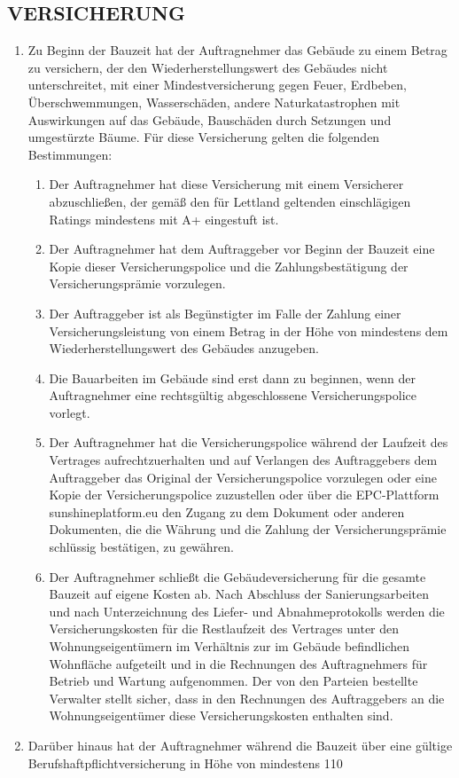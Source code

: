 \begin{multicols}{2}
   \subsection{VERSICHERUNG}
   \begin{enumerate}
     \item Zu Beginn der Bauzeit hat der Auftragnehmer das Gebäude zu einem Betrag zu versichern, der den Wiederherstellungswert des Gebäudes nicht unterschreitet, mit einer Mindestversicherung gegen Feuer, Erdbeben, Überschwemmungen, Wasserschäden, andere Naturkatastrophen mit Auswirkungen auf das Gebäude, Bauschäden durch Setzungen und umgestürzte Bäume. Für diese Versicherung gelten die folgenden Bestimmungen:
     \begin{enumerate}
   \item Der Auftragnehmer hat diese Versicherung mit einem Versicherer abzuschließen, der gemäß den für Lettland geltenden einschlägigen Ratings mindestens mit A+ eingestuft ist.
   \item Der Auftragnehmer hat dem Auftraggeber vor Beginn der Bauzeit eine Kopie dieser Versicherungspolice und die Zahlungsbestätigung der Versicherungsprämie vorzulegen.
   \item Der Auftraggeber ist als Begünstigter im Falle der Zahlung einer Versicherungsleistung von einem Betrag in der Höhe von mindestens dem Wiederherstellungswert des Gebäudes anzugeben.
   \item Die Bauarbeiten im Gebäude sind erst dann zu beginnen, wenn der Auftragnehmer eine rechtsgültig abgeschlossene Versicherungspolice vorlegt.
   \item Der Auftragnehmer hat die Versicherungspolice während der Laufzeit des Vertrages aufrechtzuerhalten und auf Verlangen des Auftraggebers dem Auftraggeber das Original der Versicherungspolice vorzulegen oder eine Kopie der Versicherungspolice zuzustellen oder über die EPC-Plattform sunshineplatform.eu den Zugang zu dem Dokument oder anderen Dokumenten, die die Währung und die Zahlung der Versicherungsprämie schlüssig bestätigen,  zu gewähren.
   \item Der Auftragnehmer schließt die Gebäudeversicherung für die gesamte Bauzeit auf eigene Kosten  ab. Nach Abschluss der Sanierungsarbeiten und nach Unterzeichnung des Liefer- und Abnahmeprotokolls werden die Versicherungskosten für die Restlaufzeit des Vertrages unter den Wohnungseigentümern im Verhältnis zur im Gebäude befindlichen Wohnfläche aufgeteilt und in die Rechnungen des Auftragnehmers für Betrieb und Wartung aufgenommen. Der von den Parteien bestellte Verwalter stellt sicher, dass in den Rechnungen des Auftraggebers an die Wohnungseigentümer diese Versicherungskosten enthalten sind.
   \end{enumerate}
   \item Darüber hinaus hat der Auftragnehmer während die Bauzeit über eine gültige Berufshaftpflichtversicherung in Höhe von mindestens 110 %
   \end{enumerate}


\end{multicols}
